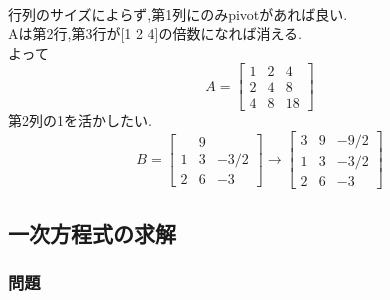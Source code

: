 \\
行列のサイズによらず,第1列にのみpivotがあれば良い.\\
Aは第2行,第3行が[1 2 4]の倍数になれば消える.\\
よって
\[A=
\begin{bmatrix}
    1 & 2 & 4 \\
    2 & 4 & 8 \\
    4 & 8 & 18
\end{bmatrix}\]
第2列の1を活かしたい.\\
\[B=
\begin{bmatrix}
    & 9 & \\
    1 & 3 & -3/2 \\
    2 & 6 & -3    
\end{bmatrix}\rightarrow
\begin{bmatrix}
    3 & 9 & -9/2 \\
    1 & 3 & -3/2 \\
    2 & 6 & -3  
\end{bmatrix}\]
\subsection{一次方程式の求解}
\subsubsection{問題}

